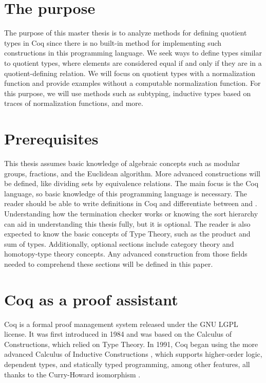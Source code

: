 \section{The purpose}
The purpose of this master thesis is to analyze methods for defining quotient types in Coq since there is no built-in method for implementing such constructions in this programming language. We seek ways to define types similar to quotient types, where elements are considered equal if and only if they are in a quotient-defining relation. We will focus on quotient types with a normalization function and provide examples without a computable normalization function. For this purpose, we will use methods such as subtyping, inductive types based on traces of normalization functions, and more.

\section{Prerequisites}
This thesis assumes basic knowledge of algebraic concepts such as modular groups, fractions, and the Euclidean algorithm. More advanced constructions will be defined, like dividing sets by equivalence relations. The main focus is the Coq language, so basic knowledge of this programming language is necessary. The reader should be able to write definitions in Coq and differentiate between  and . Understanding how the termination checker works or knowing the sort hierarchy can aid in understanding this thesis fully, but it is optional. The reader is also expected to know the basic concepts of Type Theory, such as the product and sum of types. Additionally, optional sections include category theory and homotopy-type theory concepts. Any advanced construction from those fields needed to comprehend these sections will be defined in this paper.

\section{Coq as a proof assistant}
Coq is a formal proof management system released under the GNU LGPL license. It was first introduced in 1984 and was based on the Calculus of Constructions, which relied on Type Theory. In 1991, Coq began using the more advanced Calculus of Inductive Constructions \cite{coqDoc} \cite{cicOrigins}, which supports higher-order logic, dependent types, and statically typed programming, among other features, all thanks to the Curry-Howard isomorphism \cite{curry-howard}.

